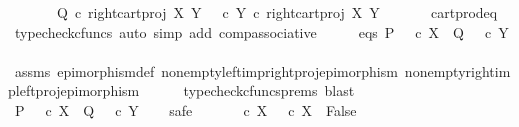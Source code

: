 \begin{isabellebody}
\ \ \ \ \ \ {\isasymand}\ Q\ {\isasymcirc}\isactrlsub c\ right{\isacharunderscore}{\kern0pt}cart{\isacharunderscore}{\kern0pt}proj\ X\ Y\ {\isacharequal}{\kern0pt}\ {\isacharparenleft}{\kern0pt}{\isasymf}\ {\isasymcirc}\isactrlsub c\ {\isasymbeta}\isactrlbsub Y\isactrlesub {\isacharparenright}{\kern0pt}\ {\isasymcirc}\isactrlsub c\ right{\isacharunderscore}{\kern0pt}cart{\isacharunderscore}{\kern0pt}proj\ X\ Y{\isachardoublequoteclose}\isanewline
\ \ \ \ \isamarkupfalse%
\ \ cart{\isacharunderscore}{\kern0pt}prod{\isacharunderscore}{\kern0pt}eq{}\ \isamarkupfalse%
\ {\isacharparenleft}{\kern0pt}typecheck{\isacharunderscore}{\kern0pt}cfuncs{\isacharcomma}{\kern0pt}\ auto\ simp\ add{\isacharcolon}{\kern0pt}\ comp{\isacharunderscore}{\kern0pt}associative{}{\isacharparenright}{\kern0pt}\isanewline
\ \ \isamarkupfalse%
\ \isamarkupfalse%
\ eqs{\isacharcolon}{\kern0pt}\ {\isachardoublequoteopen}P\ {\isacharequal}{\kern0pt}\ {\isasymf}\ {\isasymcirc}\isactrlsub c\ {\isasymbeta}\isactrlbsub X\isactrlesub \ {\isasymand}\ Q\ {\isacharequal}{\kern0pt}\ {\isasymf}\ {\isasymcirc}\isactrlsub c\ {\isasymbeta}\isactrlbsub Y\isactrlesub {\isachardoublequoteclose}\isanewline
\ \ \ \ \isamarkupfalse%
\ assms\ epimorphism{\isacharunderscore}{\kern0pt}def{}\ nonempty{\isacharunderscore}{\kern0pt}left{\isacharunderscore}{\kern0pt}imp{\isacharunderscore}{\kern0pt}right{\isacharunderscore}{\kern0pt}proj{\isacharunderscore}{\kern0pt}epimorphism\ nonempty{\isacharunderscore}{\kern0pt}right{\isacharunderscore}{\kern0pt}imp{\isacharunderscore}{\kern0pt}left{\isacharunderscore}{\kern0pt}proj{\isacharunderscore}{\kern0pt}epimorphism\isanewline
\ \ \ \ \isamarkupfalse%
\ {\isacharparenleft}{\kern0pt}typecheck{\isacharunderscore}{\kern0pt}cfuncs{\isacharunderscore}{\kern0pt}prems{\isacharcomma}{\kern0pt}\ blast{\isacharparenright}{\kern0pt}\isanewline
\ \ \isamarkupfalse%
\ \isamarkupfalse%
\ {\isachardoublequoteopen}P\ {\isasymnoteq}\ {\isasymt}\ {\isasymcirc}\isactrlsub c\ {\isasymbeta}\isactrlbsub X\isactrlesub \ {\isasymand}\ Q\ {\isasymnoteq}\ {\isasymt}\ {\isasymcirc}\isactrlsub c\ {\isasymbeta}\isactrlbsub Y\isactrlesub {\isachardoublequoteclose}\isanewline
\ \ \isamarkupfalse%
\ safe\isanewline
\ \ \ \ \isamarkupfalse%
\ {\isachardoublequoteopen}{\isasymf}\ {\isasymcirc}\isactrlsub c\ {\isasymbeta}\isactrlbsub X\isactrlesub \ {\isacharequal}{\kern0pt}\ {\isasymt}\ {\isasymcirc}\isactrlsub c\ {\isasymbeta}\isactrlbsub X\isactrlesub \ {\isasymLongrightarrow}\ False{\isachardoublequoteclose}\isanewline

\end{isabellebody}
